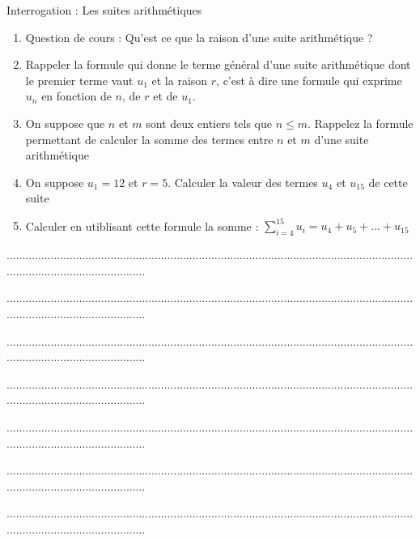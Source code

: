 \documentclass[10pt,a4paper]{exam}
\date{}
\begin{document}
Interrogation : Les suites arithmétiques
\begin{enumerate}
    \item Question de cours : Qu'est ce que la raison d'une suite arithmétique ?
    \item Rappeler la formule qui donne le terme général d'une suite arithmétique dont le premier terme vaut $u_1$ et la raison $r$, c'est à dire une formule qui exprime $u_n$ en fonction de $n$, de $r$ et de $u_1$.
    \item On suppose que $n$ et $m$ sont deux entiers tels que $n\leq m$.  Rappelez la formule permettant de calculer la somme des termes entre $n$ et $m$ d'une suite arithmétique
    \item On suppose $u_1 = 12$ et $r = 5$.  Calculer la valeur des termes $u_4$ et $u_{15}$ de cette suite
    \item Calculer en utiblisant cette formule la somme :  $\sum_{i=4}^{15} u_i = u_4 + u_5 + ... + u_{15}$
\end{enumerate}

\vspace{10mm}

.............................................................................................................................................................................

.............................................................................................................................................................................
 
.............................................................................................................................................................................

.............................................................................................................................................................................

.............................................................................................................................................................................

.............................................................................................................................................................................
 
.............................................................................................................................................................................
\end{document}
